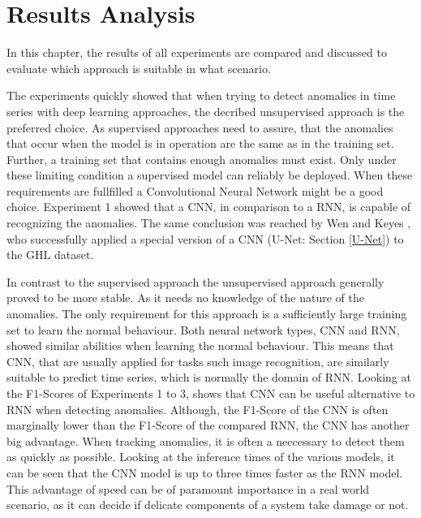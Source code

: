 \chapter{Results Analysis}

In this chapter, the results of all experiments are compared and discussed to evaluate which approach is suitable in what scenario. 

The experiments quickly showed that when trying to detect anomalies in time series with deep learning approaches, the decribed unsupervised approach is the preferred choice. As supervised approaches need to assure, that the anomalies that occur when the model is in operation are the same as in the training set. Further, a training set that contains enough anomalies must exist. Only under these limiting condition a supervised model can reliably be deployed. When these requirements are fullfilled a Convolutional Neural Network might be a good choice. 
Experiment 1 showed that a CNN, in comparison to a RNN, is capable of recognizing the anomalies. The same conclusion was reached by Wen and Keyes \parencite*{Wen2019}, who successfully applied a special version of a CNN (U-Net: Section \ref{U-Net}) to the GHL dataset.  

In contrast to the supervised approach the unsupervised approach generally proved to be more stable. As it needs no knowledge of the nature of the anomalies. The only requirement for this approach is a sufficiently large training set to learn the normal behaviour. Both neural network types, CNN and RNN, showed similar abilities when learning the normal behaviour. This means that CNN, that are usually applied for tasks such image recognition, are similarly suitable to predict time series, which is normally the domain of RNN. Looking at the F1-Scores of Experiments 1 to 3, shows that CNN can be useful alternative to RNN when detecting anomalies. Although, the F1-Score of the CNN is often marginally lower than the F1-Score of the compared RNN, the CNN has another big advantage. When tracking anomalies, it is often a neccessary to detect them as quickly as possible. Looking at the inference times of the various models, it can be seen that the CNN model is up to three times faster as the RNN model. This advantage of speed can be of paramount importance in a real world scenario, as it can decide if delicate components of a system take damage or not.

